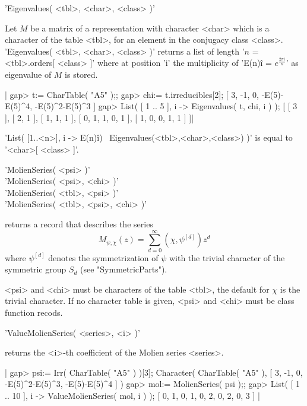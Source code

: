 
'Eigenvalues( <tbl>, <char>, <class> )'

Let $M$ be a matrix of a representation  with character <char> which is a
character of the   table <tbl>, for an  element  in the  conjugacy  class
<class>.    'Eigenvalues( <tbl>, <char>,  <class>  )'  returns a list  of
length  '$n$  =  <tbl>.orders[  <class>   ]' where at    position 'i' the
multiplicity of 'E(n)\^i  = $e^{\frac{2\pi i}{n}}$'  as eigenvalue of $M$
is stored.

|    gap> t:= CharTable( "A5" );;
    gap> chi:= t.irreducibles[2];
    [ 3, -1, 0, -E(5)-E(5)^4, -E(5)^2-E(5)^3 ]
    gap> List( [ 1 .. 5 ], i -> Eigenvalues( t, chi, i ) );
    [ [ 3 ], [ 2, 1 ], [ 1, 1, 1 ], [ 0, 1, 1, 0, 1 ], [ 1, 0, 0, 1, 1 ] ]|

'List( [1..<n>],  i ->  E(n)\^i) \*\ Eigenvalues(<tbl>,<char>,<class>) )'
is equal to '<char>[ <class> ]'.


'MolienSeries( <psi> )' \\
'MolienSeries( <psi>, <chi> )' \\
'MolienSeries( <tbl>, <psi> )' \\
'MolienSeries( <tbl>, <psi>, <chi> )'

returns  a  record   that  describes the   series  \[  M_{\psi,\chi}(z) =
\sum_{d=0}^{\infty} (\chi,\psi^{[d]})  z^d \] where  $\psi^{[d]}$ denotes
the symmetrization of $\psi$ with  the trivial character of the symmetric
group $S_d$ (see "SymmetricParts").

<psi> and  <chi> must be characters of  the table  <tbl>, the default for
$\chi$ is  the trivial character.  If  no character table is given, <psi>
and <chi> must be class function recods.

\vspace{3mm}

'ValueMolienSeries( <series>, <i> )'%

returns the <i>-th coefficient of the Molien series <series>.

|    gap> psi:= Irr( CharTable( "A5" ) )[3];
    Character( CharTable( "A5" ),
    [ 3, -1, 0, -E(5)^2-E(5)^3, -E(5)-E(5)^4 ] )
    gap> mol:= MolienSeries( psi );;
    gap> List( [ 1 .. 10 ], i -> ValueMolienSeries( mol, i ) );
    [ 0, 1, 0, 1, 0, 2, 0, 2, 0, 3 ] |

